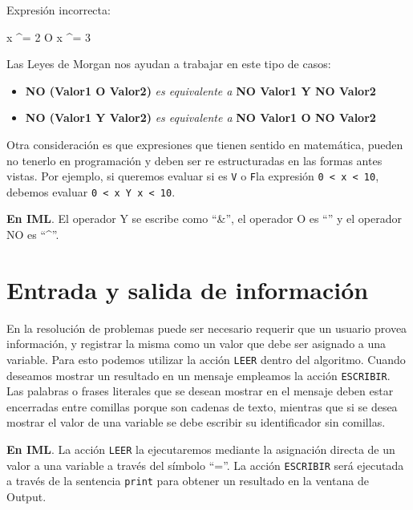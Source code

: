 \documentclass[
]{book}
\newenvironment{Shaded}{\begin{snugshade}}{\end{snugshade}}
\newcommand{\NormalTok}[1]{#1}
\providecommand{\tightlist}{%
  \setlength{\itemsep}{0pt}\setlength{\parskip}{0pt}}
\begin{document}
Expresión incorrecta:

\begin{Shaded}
\begin{Highlighting}[]
\NormalTok{x \^{}= 2 O x \^{}= 3}
\end{Highlighting}
\end{Shaded}

Las Leyes de Morgan nos ayudan a trabajar en este tipo de casos:

\begin{itemize}
\tightlist
\item
  \textbf{NO (Valor1 O Valor2)} \emph{es equivalente a} \textbf{NO Valor1 Y NO Valor2}
\item
  \textbf{NO (Valor1 Y Valor2)} \emph{es equivalente a} \textbf{NO Valor1 O NO Valor2}
\end{itemize}

Otra consideración es que expresiones que tienen sentido en matemática, pueden no tenerlo en programación y deben ser re estructuradas en las formas antes vistas. Por ejemplo, si queremos evaluar si es \texttt{V} o \texttt{F}la expresión \texttt{0\ \textless{}\ x\ \textless{}\ 10}, debemos evaluar \texttt{0\ \textless{}\ x\ Y\ x\ \textless{}\ 10}.

\textbf{En IML}. El operador Y se escribe como ``\&'', el operador O es ``\textbar{}'' y el operador NO es ``\^{}''.

\hypertarget{entrada-y-salida-de-informaciuxf3n}{%
\section{Entrada y salida de información}\label{entrada-y-salida-de-informaciuxf3n}}

En la resolución de problemas puede ser necesario requerir que un usuario provea información, y registrar la misma como un valor que debe ser asignado a una variable. Para esto podemos utilizar la acción \texttt{LEER} dentro del algoritmo. Cuando deseamos mostrar un resultado en un mensaje empleamos la acción \texttt{ESCRIBIR}. Las palabras o frases literales que se desean mostrar en el mensaje deben estar encerradas entre comillas porque son cadenas de texto, mientras que si se desea mostrar el valor de una variable se debe escribir su identificador sin comillas.

\textbf{En IML}. La acción \texttt{LEER} la ejecutaremos mediante la asignación directa de un valor a una variable a través del símbolo ``=''. La acción \texttt{ESCRIBIR} será ejecutada a través de la sentencia \texttt{print} para obtener un resultado en la ventana de Output.
\end{document}
